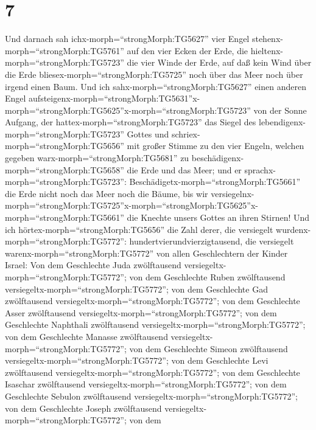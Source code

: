 \hypertarget{section-6}{%
\section{7}\label{section-6}}

 Und darnach sah ichx-morph=``strongMorph:TG5627'' vier
Engel stehenx-morph=``strongMorph:TG5761'' auf den vier Ecken der Erde,
die hieltenx-morph=``strongMorph:TG5723'' die vier Winde der Erde, auf
daß kein Wind über die Erde bliesex-morph=``strongMorph:TG5725'' noch
über das Meer noch über irgend einen Baum.  Und ich
sahx-morph=``strongMorph:TG5627'' einen anderen Engel
aufsteigenx-morph=``strongMorph:TG5631''\textbar x-morph=``strongMorph:TG5625''x-morph=``strongMorph:TG5723''
von der Sonne Aufgang, der hattex-morph=``strongMorph:TG5723'' das
Siegel des lebendigenx-morph=``strongMorph:TG5723'' Gottes und
schriex-morph=``strongMorph:TG5656'' mit großer Stimme zu den vier
Engeln, welchen gegeben warx-morph=``strongMorph:TG5681'' zu
beschädigenx-morph=``strongMorph:TG5658'' die Erde und das Meer;
 und er sprachx-morph=``strongMorph:TG5723'':
Beschädigetx-morph=``strongMorph:TG5661'' die Erde nicht noch das Meer
noch die Bäume, bis wir
versiegelnx-morph=``strongMorph:TG5725''\textbar x-morph=``strongMorph:TG5625''x-morph=``strongMorph:TG5661''
die Knechte unsers Gottes an ihren Stirnen!  Und ich
hörtex-morph=``strongMorph:TG5656'' die Zahl derer, die versiegelt
wurdenx-morph=``strongMorph:TG5772'': hundertvierundvierzigtausend, die
versiegelt warenx-morph=``strongMorph:TG5772'' von allen Geschlechtern
der Kinder Israel:  Von dem Geschlechte Juda zwölftausend
versiegeltx-morph=``strongMorph:TG5772''; von dem Geschlechte Ruben
zwölftausend versiegeltx-morph=``strongMorph:TG5772''; von dem
Geschlechte Gad zwölftausend versiegeltx-morph=``strongMorph:TG5772'';
 von dem Geschlechte Asser zwölftausend
versiegeltx-morph=``strongMorph:TG5772''; von dem Geschlechte Naphthali
zwölftausend versiegeltx-morph=``strongMorph:TG5772''; von dem
Geschlechte Manasse zwölftausend
versiegeltx-morph=``strongMorph:TG5772'';  von dem
Geschlechte Simeon zwölftausend
versiegeltx-morph=``strongMorph:TG5772''; von dem Geschlechte Levi
zwölftausend versiegeltx-morph=``strongMorph:TG5772''; von dem
Geschlechte Isaschar zwölftausend
versiegeltx-morph=``strongMorph:TG5772'';  von dem
Geschlechte Sebulon zwölftausend
versiegeltx-morph=``strongMorph:TG5772''; von dem Geschlechte Joseph
zwölftausend versiegeltx-morph=``strongMorph:TG5772''; von dem

